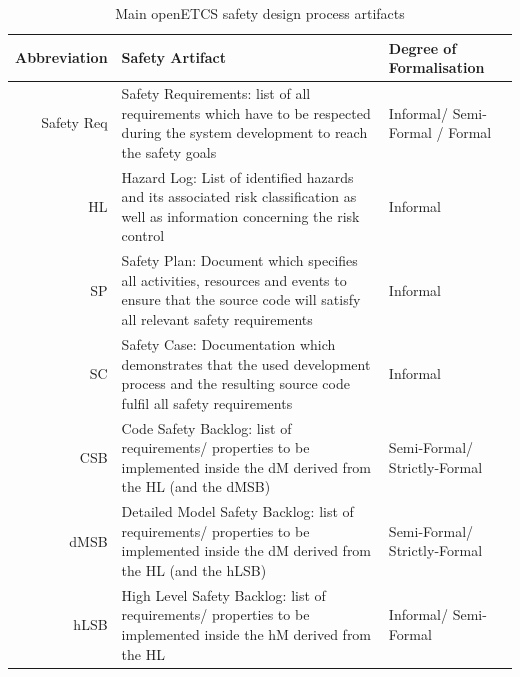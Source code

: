 \documentclass{template/openetcs_article}
\begin{document}
\begin{table}[htbp]
  \centering
  \caption{Main openETCS safety design process artifacts}
    \begin{tabular}{r|p{8cm}|p{4cm}}
    \textbf{Abbreviation} & \textbf{Safety Artifact} & \textbf{Degree of Formalisation}\\
    \hline
    Safety Req & Safety Requirements: list of all requirements which have to be respected during the system development to reach the safety goals & Informal/ Semi-Formal / Formal \\
    HL    & Hazard Log: List of identified hazards and its associated risk classification as well as information concerning the risk control & Informal \\
    SP    & Safety Plan: Document which specifies all activities, resources and events to ensure that the source code will satisfy all relevant safety requirements & Informal \\
    SC    & Safety Case: Documentation which demonstrates that the used development process and the resulting source code fulfil all safety requirements & Informal \\
    CSB   & Code Safety Backlog: list of requirements/ properties to be implemented inside the dM derived from  the HL (and the dMSB) & Semi-Formal/ Strictly-Formal \\
    dMSB  & Detailed Model Safety Backlog: list of requirements/ properties to be implemented inside the dM derived from the HL (and  the hLSB) & Semi-Formal/ Strictly-Formal \\
    hLSB  & High Level Safety Backlog: list of requirements/ properties to be implemented inside the hM derived from the HL & Informal/ Semi-Formal \\
    \end{tabular}%
  \label{tab:openETCS-Safety-artifacts}%
\end{table}%
\end{document}
